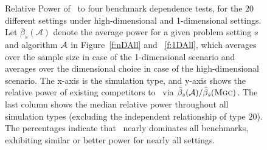 \documentclass[11pt]{article}
\begin{document}
\begin{figure}[!ht]
\centering
{}
  \caption{Relative Power of  \Mgc~to four benchmark dependence tests, for the $20$ different settings under high-dimensional and 1-dimensional settings.  
Let $\bar{\beta}_s(\mathcal{A})$ denote the average power for a given problem setting $s$ and algorithm $\mathcal{A}$ in Figure~\ref{f:nDAll} and ~\ref{f:1DAll}, which averages over the sample size in case of the 1-dimensional scenario and averages over the dimensional choice in case of the high-dimensional scenario. The x-axis is the simulation type, and y-axis shows the relative power of existing competitors to \Mgc~via $\bar{\beta}_s(\mathcal{A}) / \bar{\beta}_s({\normalfont\textsc{Mgc}})$. The last column shows the median relative power throughout all simulation types (excluding the independent relationship of type $20$). The percentages indicate that \Mgc~nearly dominates all benchmarks, exhibiting similar or better power for nearly all settings.
}
\label{f:Summary2}
\end{figure}
\end{document}
